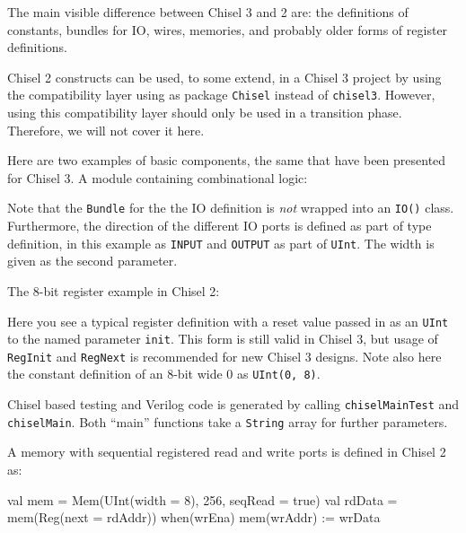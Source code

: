 \documentclass[%
    10pt, %
    headinclude, footexclude,
    openright, %
    notitlepage,
    cleardoubleempty,
    headsepline,
    pointlessnumbers,
    bibtotoc, idxtotoc,
    ]{scrbook}
\newcommand{\code}[1]{{\small{\texttt{#1}}}}
\begin{document}
The main visible difference between Chisel 3 and 2 are: the definitions of
constants, bundles for IO, wires, memories, and probably older forms of register
definitions.

Chisel 2 constructs can be used, to some extend, in a Chisel 3 project by
using the compatibility layer using as package \code{Chisel} instead of \code{chisel3}.
However, using this compatibility layer should only be used in a transition phase.
Therefore, we will not cover it here.

Here are two examples of basic components, the same that have been presented
for Chisel 3. A module containing combinational logic:



Note that the \code{Bundle} for the the IO definition is \emph{not} wrapped into
an \code{IO()} class.  Furthermore, the direction of the different IO ports is defined
as part of type definition, in this example as \code{INPUT} and \code{OUTPUT}
as part of \code{UInt}. The width is given as the second parameter.

\begin{minipage}{\linewidth}
The 8-bit register example in Chisel 2:


\end{minipage}

Here you see a typical register definition with a reset value passed in as
an \code{UInt} to the named parameter \code{init}. This form is still valid in Chisel 3,
but usage of \code{RegInit} and \code{RegNext} is recommended for new Chisel 3 designs.
Note also here the constant definition of an 8-bit wide 0 as \code{UInt(0, 8)}.

Chisel based testing and Verilog code is generated by calling \code{chiselMainTest}
and \code{chiselMain}. Both ``main'' functions take a \code{String} array for further parameters.





A memory with sequential registered read and write ports is defined in Chisel 2 as:

\begin{chisel}
  val mem = Mem(UInt(width = 8), 256, seqRead = true)
  val rdData = mem(Reg(next = rdAddr))
  when(wrEna) {
    mem(wrAddr) := wrData
  }
\end{chisel}
\end{document}
